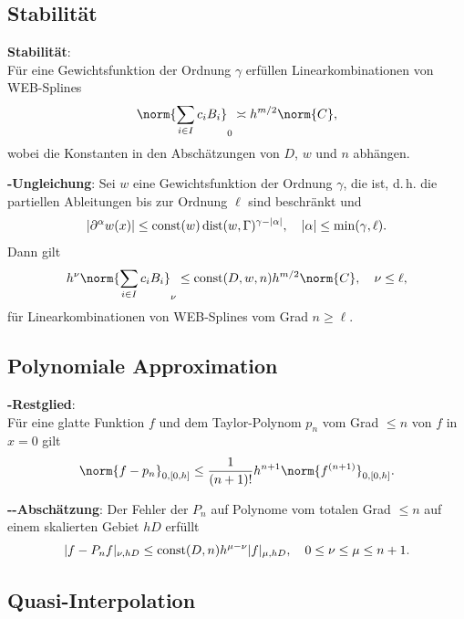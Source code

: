 \subsection{%
    Stabilität%
}

\textbf{Stabilität}:\\
Für eine Gewichtsfunktion der Ordnung $\gamma$ erfüllen Linearkombinationen von WEB-Splines
\begin{align*}
    \norm{\sum_{i \in I} c_i B_i}_0 \asymp h^{m/2} \norm{C},
\end{align*}
wobei die Konstanten in den Abschätzungen von $D$, $w$ und $n$ abhängen.

\textbf{-Ungleichung}:
Sei $w$ eine Gewichtsfunktion der Ordnung $\gamma$, die  ist,
d.\,h. die partiellen Ableitungen bis zur Ordnung $\ell$ sind beschränkt und
\begin{align*}
    |\partial^\alpha w(x)| \le \operatorname{const}(w) \operatorname{dist}(w, \Gamma)^{\gamma-|\alpha|},\quad
    |\alpha| \le \min(\gamma, \ell).
\end{align*}
Dann gilt
\begin{align*}
    h^\nu \norm{\sum_{i \in I} c_i B_i}_\nu
    \le \const(D, w, n) h^{m/2} \norm{C},\quad
    \nu \le \ell,
\end{align*}
für Linearkombinationen von WEB-Splines vom Grad $n \ge \ell$.

\subsection{%
    Polynomiale Approximation%
}

\textbf{-Restglied}:\\
Für eine glatte Funktion $f$ und dem Taylor-Polynom $p_n$ vom Grad $\le n$
von $f$ in $x = 0$ gilt
\begin{align*}
    \norm{f - p_n}_{0,[0,h]}
    \le \frac{1}{(n+1)!} h^{n+1} \norm{f^{(n+1)}}_{0,[0,h]}.
\end{align*}

\textbf{--Abschätzung}:
Der Fehler der  $P_n$ auf Polynome vom totalen Grad $\le n$
auf einem skalierten Gebiet $hD$ erfüllt
\begin{align*}
    |f - P_n f|_{\nu,hD}
    \le \operatorname{const}(D, n) h^{\mu-\nu} |f|_{\mu,hD},\quad
    0 \le \nu \le \mu \le n + 1.
\end{align*}

\subsection{%
    Quasi-Interpolation%
}

